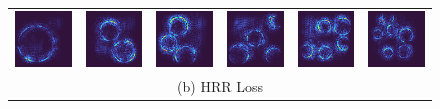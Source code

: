 \documentclass[letterpaper]{article} %
\begin{document}
\begin{figure}[!htbp]
\begin{tabular}{cccccc}
\multicolumn{1}{c}{\includegraphics[width=0.125\columnwidth]{saliency/hrr/circle/ring_1.png}} \hspace{-12pt} &  \multicolumn{1}{c}{\includegraphics[width=0.125\columnwidth]{saliency/hrr/circle/ring_2.png}} \hspace{-12pt} & \multicolumn{1}{c}{\includegraphics[width=0.125\columnwidth]{saliency/hrr/circle/ring_3.png}} \hspace{-12pt} & \multicolumn{1}{c}{\includegraphics[width=0.125\columnwidth]{saliency/hrr/circle/ring_4.png}} \hspace{-12pt} & \multicolumn{1}{c}{\includegraphics[width=0.125\columnwidth]{saliency/hrr/circle/ring_5.png}} \hspace{-12pt} & \multicolumn{1}{c}{\includegraphics[width=0.125\columnwidth]{saliency/hrr/circle/ring_6.png}} \\
\multicolumn{6}{c}{(b) HRR Loss} \\


\end{tabular}
\end{figure}
\end{document}
